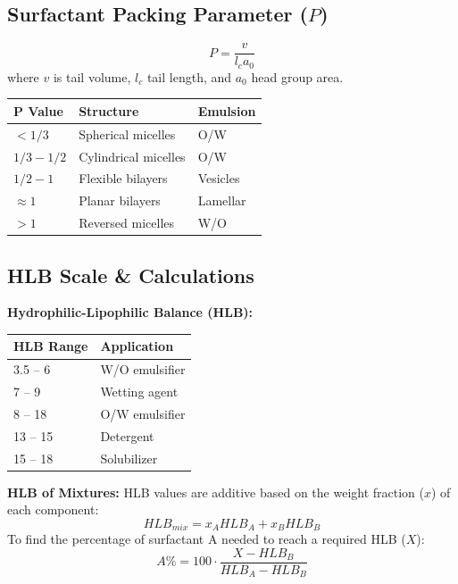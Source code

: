 \subsection{Surfactant Packing Parameter ($P$)}
\begin{equation}
    P = \frac{v}{l_c a_0}
\end{equation}
where $v$ is tail volume, $l_c$ tail length, and $a_0$ head group area.
\begin{center}
\begin{tabular}{l l l}
\toprule
\textbf{P Value} & \textbf{Structure} & \textbf{Emulsion} \\
\midrule
$< 1/3$ & Spherical micelles & O/W \\
$1/3 - 1/2$ & Cylindrical micelles & O/W \\
$1/2 - 1$ & Flexible bilayers & Vesicles \\
$\approx 1$ & Planar bilayers & Lamellar \\
$> 1$ & Reversed micelles & W/O \\
\bottomrule
\end{tabular}
\end{center}

\subsection{HLB Scale \& Calculations}
\textbf{Hydrophilic-Lipophilic Balance (HLB):}
\begin{center}
\begin{tabular}{l l}
\toprule
\textbf{HLB Range} & \textbf{Application} \\
\midrule
3.5 -- 6 & W/O emulsifier \\
7 -- 9 & Wetting agent \\
8 -- 18 & O/W emulsifier \\
13 -- 15 & Detergent \\
15 -- 18 & Solubilizer \\
\bottomrule
\end{tabular}
\end{center}

\textbf{HLB of Mixtures:}
HLB values are additive based on the weight fraction ($x$) of each component:
\begin{equation}
    HLB_{mix} = x_A HLB_A + x_B HLB_B
\end{equation}
To find the percentage of surfactant A needed to reach a required HLB ($X$):
\begin{equation}
    A\% = 100 \cdot \frac{X - HLB_B}{HLB_A - HLB_B}
\end{equation}

